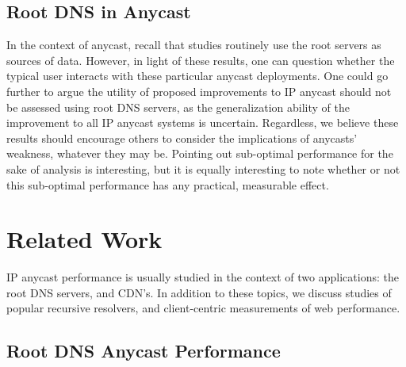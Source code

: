 \documentclass[sigconf,nonacm,10pt]{acmart}
\begin{document}
\subsection{Root DNS in Anycast}\label{root-dns-in-anycast}

\label{sec:discussion_implications} In the context of anycast, recall
that studies routinely use the root servers as sources of data. However,
in light of these results, one can question whether the typical user
interacts with these particular anycast deployments. One could go
further to argue the utility of proposed improvements to IP anycast
should not be assessed using root DNS servers, as the generalization
ability of the improvement to all IP anycast systems is uncertain.
\break
Regardless, we believe these results should encourage others to consider
the implications of anycasts' weakness, whatever they may be. Pointing
out sub-optimal performance for the sake of analysis is interesting, but
it is equally interesting to note whether or not this sub-optimal
performance has any practical, measurable effect.

\section{Related Work}\label{related-work-1}

\label{sec:related} IP anycast performance is usually studied in the
context of two applications: the root DNS servers, and CDN's. In
addition to these topics, we discuss studies of popular recursive
resolvers, and client-centric measurements of web performance.

\subsection{Root DNS Anycast
Performance}\label{root-dns-anycast-performance}
\end{document}
